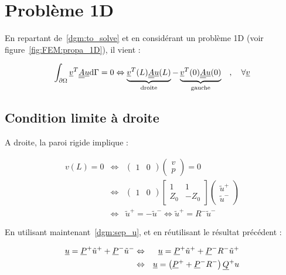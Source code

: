 \section{Problème 1D}

En repartant de~\eqref{dgm:to_solve} et en considérant un problème 1D (voir figure~\ref{fig:FEM:propa_1D}), il vient :

\begin{equation}
    \int_{\partial\Omega}\underline{v}^T\underline{\underline{A}}\underline{u}\mathrm{d}\Gamma = 0 \Leftrightarrow
\underbrace{\underline{v}^T(L)\underline{\underline{A}}\underline{u}(L)}_\mathrm{droite} - \underbrace{\underline{v}^T(0)\underline{\underline{A}}\underline{u}(0)}_\mathrm{gauche}
\quad,\quad \forall\underline{v}\label{dgm:d_g}
\end{equation}

\subsection{Condition limite à droite}

A droite, la paroi rigide implique :

\begin{eqnarray*}
    v(L) = 0 & \Leftrightarrow &
    \begin{pmatrix}
        1 & 0
    \end{pmatrix}
    \begin{pmatrix}
        v\\p
    \end{pmatrix}
     = 0\\
    & \Leftrightarrow &
    \begin{pmatrix}
        1 & 0
    \end{pmatrix}
    \begin{bmatrix}
        1 & 1\\
        Z_0 & -Z_0
    \end{bmatrix}
    \begin{pmatrix}
        \tilde{u}^+\\\tilde{u}^-
    \end{pmatrix}\\
    & \Leftrightarrow &
    \tilde{u}^+ = -\tilde{u}^- \Leftrightarrow \tilde{u}^+ = R^-\tilde{u}^-
\end{eqnarray*}

En utilisant maintenant~\eqref{dgm:sep_u}, et en réutilisant le résultat précédent :

\begin{eqnarray}
    \underline{u} = \underline{P}^+\tilde{u}^+ + \underline{P}^-\tilde{u}^-
        & \Leftrightarrow & \underline{u} = \underline{P}^+\tilde{u}^+ + \underline{P}^-R^-\tilde{u}^+\notag\\
        & \Leftrightarrow & \underline{u} = \left(\underline{P}^+ + \underline{P}^-R^-\right)\underline{Q}^+u\label{dgm:droite}
\end{eqnarray}

